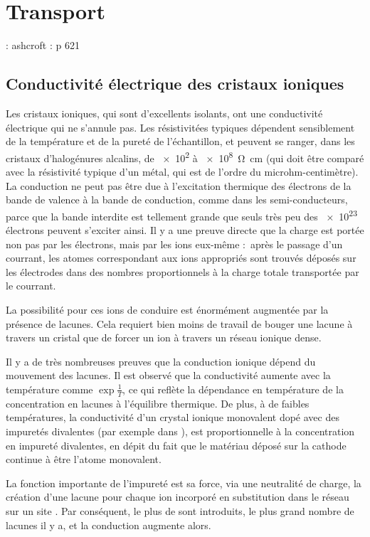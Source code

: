 \chapter{Transport}

\TODO : ashcroft : p 621

\section{Conductivité électrique des cristaux ioniques}

Les cristaux ioniques, qui sont d'excellents isolants, ont une conductivité électrique qui ne s'annule pas. Les résistivitées typiques dépendent sensiblement de la température et de la pureté de l'échantillon, et peuvent se ranger, dans les cristaux d'halogénures alcalins, de \SI{e2}{} à \SI{e8}{\ohm\centi\metre} (qui doit être comparé avec la résistivité typique d'un métal, qui est de l'ordre du microhm-centimètre). La conduction ne peut pas être due à l'excitation thermique des électrons de la bande de valence à la bande de conduction, comme dans les semi-conducteurs, parce que la bande interdite est tellement grande que seuls très peu des \SI{e23}{} électrons peuvent s'exciter ainsi.
Il y a une preuve directe que la charge est portée non pas par les électrons, mais par les ions eux-même : après le passage d'un courrant, les atomes correspondant aux ions appropriés sont trouvés déposés sur les électrodes dans des nombres proportionnels à la charge totale transportée par le courrant.

La possibilité pour ces ions de conduire est énormément augmentée par la présence de lacunes. Cela requiert bien moins de travail de bouger une lacune à travers un cristal que de forcer un ion à travers un réseau ionique dense.

Il y a de très nombreuses preuves que la conduction ionique dépend du mouvement des lacunes. Il est observé que la conductivité aumente avec la température comme $\exp \frac{1}{T}$, ce qui reflète la dépendance en température de la concentration en lacunes à l'équilibre thermique. De plus, à de faibles températures, la conductivité d'un crystal ionique monovalent dopé avec des impuretés divalentes (par exemple  dans ), est proportionnelle à la concentration en impureté divalentes, en dépit du fait que le matériau déposé sur la cathode continue à être l'atome monovalent.

La fonction importante de l'impureté est sa force, via une neutralité de charge, la création d'une lacune  pour chaque ion  incorporé en substitution dans le réseau sur un site . Par conséquent, le plus de  sont introduits, le plus grand nombre de lacunes  il y a, et la conduction augmente alors.

